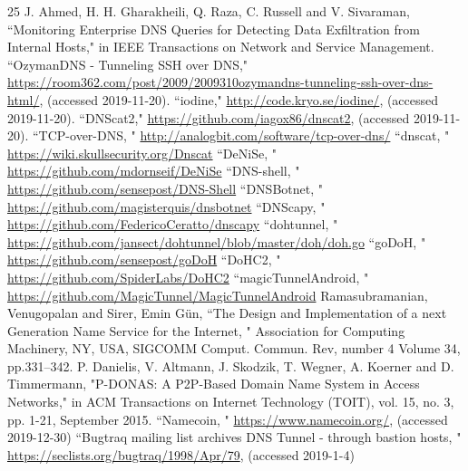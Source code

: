\documentclass[12pt]{jarticle} %
\begin{document}
\begin{thebibliography} {25}
  J. Ahmed, H. H. Gharakheili, Q. Raza, C. Russell and V. Sivaraman, ``Monitoring Enterprise DNS Queries for Detecting Data Exfiltration from Internal Hosts," in IEEE Transactions on Network and Service Management.
  ``OzymanDNS - Tunneling SSH over DNS," \href{https://room362.com/post/2009/2009310ozymandns-tunneling-ssh-over-dns-html/}{https://room362.com/post/2009/2009310ozymandns-tunneling-ssh-over-dns-html/}, (accessed 2019-11-20).
  ``iodine," \href{http://code.kryo.se/iodine/}{http://code.kryo.se/iodine/}, (accessed 2019-11-20).
  ``DNScat2," \href{https://github.com/iagox86/dnscat2}{https://github.com/iagox86/dnscat2}, (accessed 2019-11-20).
  ``TCP-over-DNS, " \href{http://analogbit.com/software/tcp-over-dns/}{http://analogbit.com/software/tcp-over-dns/}
  ``dnscat, " \href{https://wiki.skullsecurity.org/Dnscat}{https://wiki.skullsecurity.org/Dnscat}
  ``DeNiSe, " \href{https://github.com/mdornseif/DeNiSe}{https://github.com/mdornseif/DeNiSe}
  ``DNS-shell, " \href{https://github.com/sensepost/DNS-Shell}{https://github.com/sensepost/DNS-Shell}
  ``DNSBotnet, " \href{https://github.com/magisterquis/dnsbotnet}{https://github.com/magisterquis/dnsbotnet}
  ``DNScapy, " \href{https://github.com/FedericoCeratto/dnscapy}{https://github.com/FedericoCeratto/dnscapy}
  ``dohtunnel, " \href{https://github.com/jansect/dohtunnel/blob/master/doh/doh.go}{https://github.com/jansect/dohtunnel/blob/master/doh/doh.go}
  ``goDoH, " \href{https://github.com/sensepost/goDoH}{https://github.com/sensepost/goDoH}
  ``DoHC2, " \href{https://github.com/SpiderLabs/DoHC2}{https://github.com/SpiderLabs/DoHC2}
  ``magicTunnelAndroid, " \href{https://github.com/MagicTunnel/MagicTunnelAndroid}{https://github.com/MagicTunnel/MagicTunnelAndroid}
  Ramasubramanian, Venugopalan and Sirer, Emin G\"{u}n, ``The Design and Implementation of a next Generation Name Service for the Internet, " Association for Computing Machinery, NY, USA, SIGCOMM Comput. Commun. Rev, number 4 Volume 34, pp.331–342.
  P. Danielis, V. Altmann, J. Skodzik, T. Wegner, A. Koerner and D. Timmermann, "P-DONAS: A P2P-Based Domain Name System in Access Networks," in ACM Transactions on Internet Technology (TOIT), vol. 15, no. 3, pp. 1-21, September 2015.
  ``Namecoin, " \href{https://www.namecoin.org/}{https://www.namecoin.org/}, (accessed 2019-12-30)
  ``Bugtraq mailing list archives DNS Tunnel - through bastion hosts, " \href{https://seclists.org/bugtraq/1998/Apr/79}{https://seclists.org/bugtraq/1998/Apr/79}, (accessed 2019-1-4)
\end{thebibliography}

\end{document}
